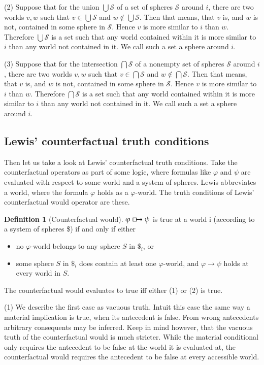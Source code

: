 \documentclass[a4paper,american,10pt]{paper}
\theoremstyle{definition}\newtheorem{lemma}[thm]{Lemma}
\theoremstyle{definition}\newtheorem{proposition}[thm]{Proposition}
\theoremstyle{definition}\newtheorem{corollary}[thm]{Corollary}
\theoremstyle{definition}\newtheorem{definition}{Definition}
\begin{document}
(2) Suppose that for the union $\bigcup\mathscr{S}$ of a set of spheres $\mathscr{S}$ around $i$, there are two worlds $v,w$ such that $v\in\bigcup\mathscr{S}$ and $w\notin\bigcup\mathscr{S}$. Then that means, that $v$ is, and $w$ is not, contained in some sphere in $\mathscr{S}$. Hence $v$ is more similar to $i$ than $w$. Therefore $\bigcup\mathscr{S}$ is a set such that any world contained within it is more similar to $i$ than any world not contained in it. We call such a set a sphere around $i$.

(3) Suppose that for the intersection $\bigcap\mathscr{S}$ of a nonempty set of spheres $\mathscr{S}$ around $i$, there are two worlds $v,w$ such that $v\in\bigcap\mathscr{S}$ and $w\notin\bigcap\mathscr{S}$. Then that means, that $v$ is, and $w$ is not, contained in some sphere in $\mathscr{S}$. Hence $v$ is more similar to $i$ than $w$. Therefore $\bigcap\mathscr{S}$ is a set such that any world contained within it is more similar to $i$ than any world not contained in it. We call such a set a sphere around $i$.
\subsection{Lewis' counterfactual truth conditions}
Then let us take a look at Lewis' counterfactual truth conditions. Take the counterfactual operators as part of some logic, where formulas like $\varphi$ and $\psi$ are evaluated with respect to some world and a system of spheres. Lewis abbreviates a world, where the formula $\varphi$ holds as a $\varphi$-world. The truth conditions of Lewis' counterfactual would operator are these.
\begin{definition}[Counterfactual would]
	$\varphi\boxright\psi$ is true at a world i (according to a system of spheres \$) if and only if either
	\begin{itemize}
	\item[(1)] no $\varphi$-world belongs to any sphere $S$ in $\$_i$, or
	\item[(2)] some sphere $S$ in $\$_i$ does contain at least one $\varphi$-world, and $\varphi\rightarrow\psi$ holds at every world in $S$.
	\end{itemize}
	\label{def:counterfactual_would}
\end{definition}
\noindent The counterfactual would evaluates to true iff either (1) or (2) is true.

(1) We describe the first case as vacuous truth. Intuit this case the same way a material implication is true, when its antecedent is false. From wrong antecedents arbitrary consequents may be inferred. Keep in mind however, that the vacuous truth of the counterfactual would is much stricter. While the material conditional only requires the antecedent to be false at the world it is evaluated at, the counterfactual would requires the antecedent to be false at every accessible world.
\end{document}
